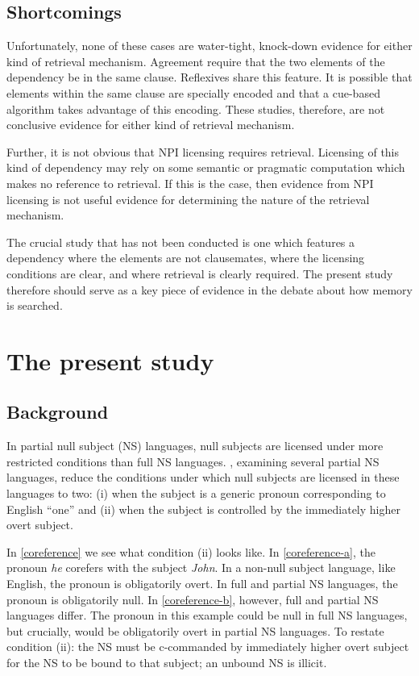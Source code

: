 \documentclass[12pt,letterpaper]{article}
\begin{document}
\subsection{Shortcomings}

Unfortunately, none of these cases are water-tight, knock-down evidence for either kind of retrieval mechanism. Agreement require that the two elements of the dependency be in the same clause. Reflexives share this feature. It is possible that elements within the same clause are specially encoded and that a cue-based algorithm takes advantage of this encoding. These studies, therefore, are not conclusive evidence for either kind of retrieval mechanism. 

Further, it is not obvious that NPI licensing requires retrieval. Licensing of this kind of dependency may rely on some semantic or pragmatic computation which makes no reference to retrieval. If this is the case, then evidence from NPI licensing is not useful evidence for determining the nature of the retrieval mechanism.

The crucial study that has not been conducted is one which features a dependency where the elements are not clausemates, where the licensing conditions are clear, and where retrieval is clearly required. The present study therefore should serve as a key piece of evidence in the debate about how memory is searched.

\section{The present study}

\subsection{Background}

In partial null subject (NS) languages, null subjects are licensed under more restricted conditions than full NS languages. \citet{holmberg09}, examining several partial NS languages, reduce the conditions under which null subjects are licensed in these languages to two: (i) when the subject is a generic pronoun corresponding to English ``one'' and (ii) when the subject is controlled by the immediately higher overt subject.

In \ref{coreference} we see what condition (ii) looks like. In \ref{coreference-a}, the pronoun \emph{he} corefers with the subject \emph{John}. In a non-null subject language, like English, the pronoun is obligatorily overt. In full and partial NS languages, the pronoun is obligatorily null. In \ref{coreference-b}, however, full and partial NS languages differ. The pronoun in this example could be null in full NS languages, but crucially, would be obligatorily overt in partial NS languages. To restate condition (ii): the NS must be c-commanded by immediately higher overt subject for the NS to be bound to that subject; an unbound NS is illicit.
\end{document}
